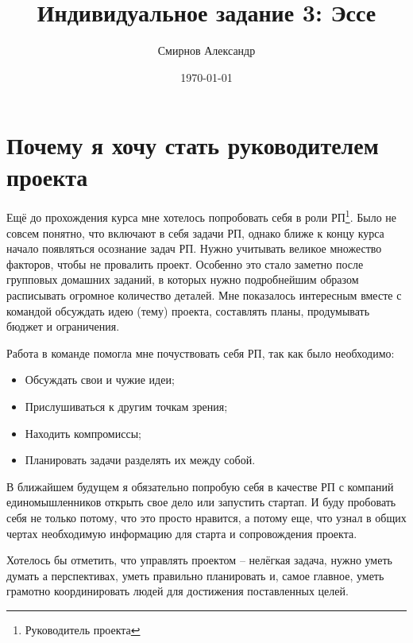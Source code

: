\documentclass[a4paper,8pt]{article}
\title{Индивидуальное задание 3: Эссе}
\author{ Смирнов Александр }
\date{\today}
\begin{document}
\maketitle


\section{Почему я хочу стать руководителем проекта}

Ещё до прохождения курса мне хотелось попробовать себя в роли РП\footnote{Руководитель проекта}. Было не совсем понятно, что включают в себя задачи РП, однако ближе к концу курса начало появляться осознание задач РП. Нужно учитывать великое множество факторов, чтобы не провалить проект. Особенно это стало заметно после групповых домашних заданий, в которых нужно подробнейшим образом расписывать огромное количество деталей. Мне показалось интересным вместе с командой обсуждать идею (тему) проекта, составлять планы, продумывать бюджет и ограничения. 

Работа в команде помогла мне почуствовать себя РП, так как было необходимо:

    \begin{itemize}
        \item Обсуждать свои и чужие идеи;
        \item Прислушиваться к другим точкам зрения;
        \item Находить компромиссы;
        \item Планировать задачи разделять их между собой.
    \end{itemize}

В ближайшем будущем я обязательно попробую себя в качестве РП с компаний единомышленников открыть свое дело или запустить стартап. И буду пробовать себя не только потому, что это просто нравится, а потому еще, что узнал в общих чертах необходимую информацию для старта и сопровождения проекта. 

Хотелось бы отметить, что управлять проектом -- нелёгкая задача, нужно уметь думать а перспективах, уметь правильно планировать и, самое главное, уметь грамотно координировать людей для достижения поставленных целей.
\end{document}

